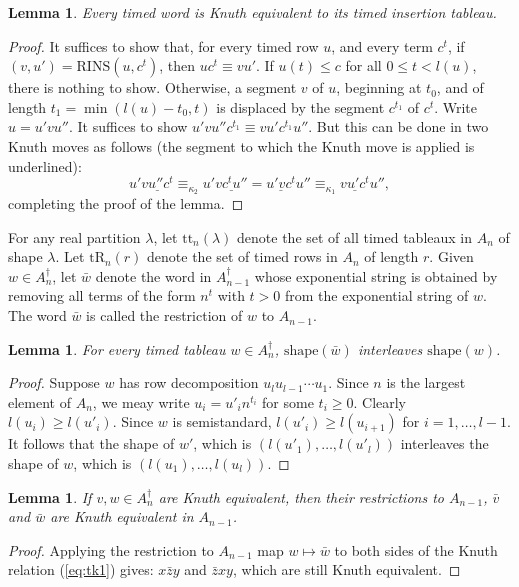 \documentclass[10pt]{amsproc}
\newtheorem{lemma}[theorem]{Lemma}
\theoremstyle{definition}
\theoremstyle{remark}
\newcommand{\rowins}{\mathrm{RINS}}
\newcommand{\shape}{\mathrm{shape}}
\newcommand{\ttab}{\mathrm{tt}}
\newcommand{\tr}{\mathrm{tR}}
\begin{document}
\begin{lemma}
  Every timed word is Knuth equivalent to its timed insertion tableau.
\end{lemma}
\begin{proof}
  It suffices to show that, for every timed row $u$, and every term $c^t$, if $(v,u')=\rowins(u,c^t)$, then $uc^t\equiv vu'$.
  If $u(t)\leq c$ for all $0\leq t<l(u)$, there is nothing to show.
  Otherwise, a segment $v$ of $u$, beginning at $t_0$, and of length $t_1=\min(l(u)-t_0,t)$ is displaced by the segment $c^{t_1}$ of $c^t$.
  Write $u=u'vu''$.
  It suffices to show $u'vu''c^{t_1}\equiv vu'c^{t_1}u''$.
  But this can be done in two Knuth moves as follows (the segment to which the Knuth move is applied is underlined):
  \begin{displaymath}
    u'\underline{v u'' c^t} \equiv_{\kappa_2} u'\underline{vc^tu''} = \underline{u'vc^t}u'' \equiv_{\kappa_1} \underline{vu'c^t}u'',
  \end{displaymath}
  completing the proof of the lemma.
\end{proof}
For any real partition $\lambda$, let $\ttab_n(\lambda)$ denote the set of all timed tableaux in $A_n$ of shape $\lambda$.
Let $\tr_n(r)$ denote the set of timed rows in $A_n$ of length $r$.
Given $w\in A_n^\dagger$, let $\bar w$ denote the word in $A_{n-1}^\dagger$ whose exponential string is obtained by removing all terms of the form $n^t$ with $t>0$ from the exponential string of $w$.
The word $\bar w$ is called the restriction of $w$ to $A_{n-1}$.
\begin{lemma}
  \label{lemma:restriction-interleaf}
  For every timed tableau $w\in A_n^\dagger$, $\shape(\bar w)$ interleaves $\shape(w)$.
\end{lemma}
\begin{proof}
  Suppose $w$ has row decomposition $u_lu_{l-1}\dotsb u_1$.
  Since $n$ is the largest element of $A_n$, we meay write $u_i=u'_in^{t_i}$ for some $t_i\geq 0$.
  Clearly $l(u_i)\geq l(u'_i)$.
  Since $w$ is semistandard, $l(u'_i)\geq l(u_{i+1})$ for $i=1,\dotsc,l-1$. 
  It follows that the shape of $w'$, which is $(l(u'_1),\dotsc,l(u'_l))$ interleaves the shape of $w$, which is $(l(u_1),\dotsc,l(u_l))$.
\end{proof}
\begin{lemma}
  \label{lemma:equivalence-restriction}
  If $v,w\in A_n^\dagger$ are Knuth equivalent, then their restrictions to $A_{n-1}$, $\bar v$ and $\bar w$ are Knuth equivalent in $A_{n-1}$.
\end{lemma}
\begin{proof}
  Applying the restriction to $A_{n-1}$ map $w\mapsto \bar w$ to both sides of the Knuth relation (\ref{eq:tk1}) gives:
  $x\bar z y$ and $\bar z x y$, which are still Knuth equivalent.
\end{proof}
\end{document}

